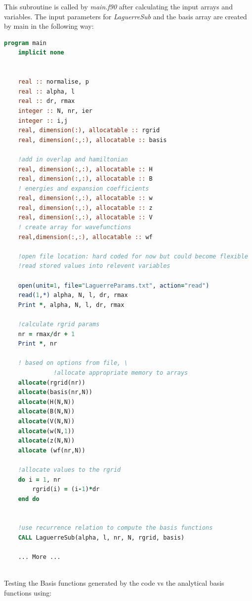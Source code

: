 \documentclass{article}
\begin{document}
    This subroutine is called by \textit{main.f90} after calculating the input arrays and variables. The input parameters for \textit{LaguerreSub} and the basis array are created by main in the following way:
\begin{lstlisting}[language=Fortran]
program main
	implicit none
	
	
	real :: normalise, p
	real :: alpha, l
	real :: dr, rmax
	integer :: N, nr, ier
	integer :: i,j
	real, dimension(:), allocatable :: rgrid
	real, dimension(:,:), allocatable :: basis
	
	!add in overlap and hamiltonian
	real, dimension(:,:), allocatable :: H
	real, dimension(:,:), allocatable :: B
	! energies and expansion coefficients
	real, dimension(:,:), allocatable :: w
	real, dimension(:,:), allocatable :: z
	real, dimension(:,:), allocatable :: V
	! create array for wavefunctions
	real,dimension(:,:), allocatable :: wf
	
	!open file location: hard coded for now but could become flexible
	!read stored values into relevent variables
	
	open(unit=1, file="LaguerreParams.txt", action="read")
	read(1,*) alpha, N, l, dr, rmax
	Print *, alpha, N, l, dr, rmax
	
	!calculate rgrid params
	nr = rmax/dr + 1
	Print *, nr
	
	! based on options from file, \
	          !allocate appropriate memory to arrays
	allocate(rgrid(nr))
	allocate(basis(nr,N))
	allocate(H(N,N))
	allocate(B(N,N))
	allocate(V(N,N))
	allocate(w(N,1))
	allocate(z(N,N))
	allocate (wf(nr,N))
	
	!allocate values to the rgrid
	do i = 1, nr
		rgrid(i) = (i-1)*dr
	end do
	
	
	!use recurrence relation to compute the basis functions
	CALL LaguerreSub(alpha, l, nr, N, rgrid, basis)
	
	... More ...
	
\end{lstlisting}
    
    
    Testing the Basis functions generated by the code vs the analytical basis functions using:
    
\end{document}
